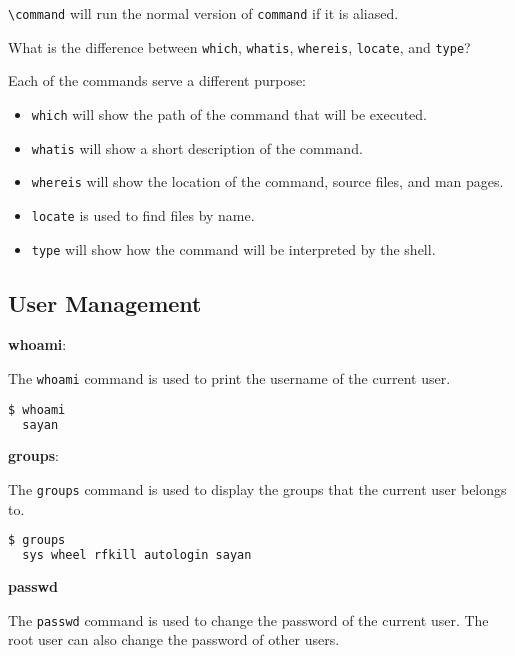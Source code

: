 \begin{ans}
  \lstinline|\command| will run the normal version of \lstinline|command| if it is aliased.
\end{ans}

\begin{qs}
  What is the difference between \lstinline|which|, \lstinline|whatis|, \lstinline|whereis|, \lstinline|locate|, and \lstinline|type|?
\end{qs}

\begin{ans}
  Each of the commands serve a different purpose:
  \begin{itemize}
    \item \lstinline|which| will show the path of the command that will be executed.
    \item \lstinline|whatis| will show a short description of the command.
    \item \lstinline|whereis| will show the location of the command, source files, and man pages.
    \item \lstinline|locate| is used to find files by name.
    \item \lstinline|type| will show how the command will be interpreted by the shell.
  \end{itemize}
\end{ans}


\subsection{User Management}

\textbf{whoami}:

The \lstinline|whoami| command is used to print the username of the current user.

\begin{lstlisting}[language=bash]
  $ whoami
  sayan
\end{lstlisting}

\textbf{groups}:

The \lstinline|groups| command is used to display the groups that the current user belongs to.

\begin{lstlisting}[language=bash]
  $ groups
  sys wheel rfkill autologin sayan
\end{lstlisting}

\textbf{passwd}

The \lstinline|passwd| command is used to change the password of the current user.
The root user can also change the password of other users.

